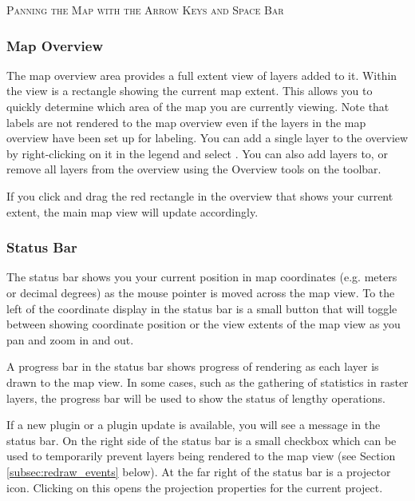 \begin{Tip}\caption{\textsc{Panning the Map with the Arrow Keys and Space Bar}}
\end{Tip}

\subsubsection{Map Overview}\label{label_mapoverview}

The map overview area provides a full extent view of layers added to it.
Within the view is a rectangle showing the current map extent. This allows
you to quickly determine which area of the map you are currently viewing. Note
that labels are not rendered to the map overview even if the layers in the
map overview have been set up for labeling. 
You can add a single layer to the overview by right-clicking on it in the legend 
and select . You can also add layers to, or remove 
all layers from the overview using the Overview tools on the toolbar.

If you click and drag the red rectangle in the overview that shows your 
current extent, the main map view will update accordingly.

\subsubsection{Status Bar}\label{label_statusbar}

The status bar shows you your current position in map coordinates (e.g.
meters or decimal degrees) as the mouse pointer is moved across the map view.
To the left of the coordinate display in the status bar is a small button that 
will toggle between showing coordinate position or the view extents of the 
map view as you pan and zoom in and out. 

A progress bar in the status bar shows progress of rendering
as each layer is drawn to the map view. In some cases, such as the gathering
of statistics in raster layers, the progress bar will be used to show the
status of lengthy operations. 

If a new plugin or a plugin update is available, you will see a message in the 
status bar. On the right side of the status bar is a small
checkbox which can be used to temporarily prevent layers being rendered to the
map view (see Section \ref{subsec:redraw_events} below). At the far right of
the status bar is a projector icon. Clicking on this opens the projection
properties for the current project.

